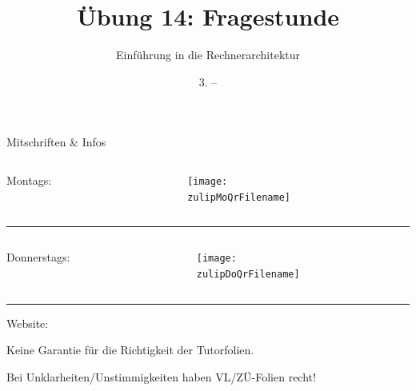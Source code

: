 \documentclass[
  german,            %
  aspectratio=169,    %
]{tumbeamer}
\title{Übung 14: Fragestunde}
\subtitle{Einführung in die Rechnerarchitektur}
\author{\theAuthorName}
\institute{\theGroupName\\\theSchoolName\\\theUniversityName}
\date{3. -- \DTMdisplaydate{2025}{02}{9}{-1}}
\begin{document}
\maketitle

\begin{frame}[c]{Mitschriften \& Infos}{}
  \begin{minipage}[t]{\textwidth}
    \begin{columns}[c]
      \begin{column}{0.8\textwidth}
        Montags: \href{\zulipMo}{\zulipMo}
      \end{column}
      \begin{column}{0.2\textwidth}
        \texttt{[image: \\zulipMoQrFilename]}
      \end{column}
    \end{columns}
  \end{minipage}
  \rule{\textwidth}{0.4pt}
  \begin{minipage}[t]{\textwidth}
    \begin{columns}[c]
      \begin{column}{0.8\textwidth}
        Donnerstags: \href{\zulipDo}{\zulipDo}
      \end{column}
      \begin{column}{0.2\textwidth}
        \texttt{[image: \\zulipDoQrFilename]}
      \end{column}
    \end{columns}
  \end{minipage}
  \ifdefined\myWebsite
  \rule{\textwidth}{0.4pt}
  \centering
  Website: \href{\myWebsite}{\myWebsite}
  \fi
\end{frame}

\begin{frame}[c]{}{}
  \begin{center}
    \LARGE  Keine Garantie für die Richtigkeit der Tutorfolien.

    \Large Bei Unklarheiten/Unstimmigkeiten haben VL/ZÜ-Folien recht!
  \end{center}
\end{frame}
\end{document}
